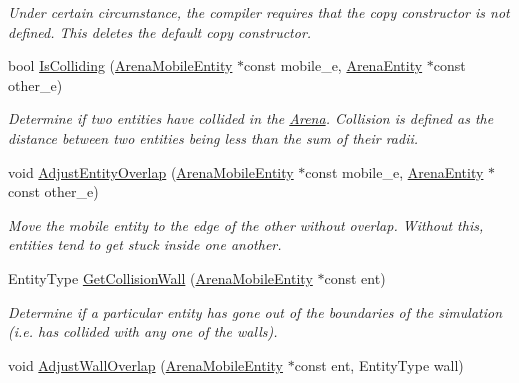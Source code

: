 \begin{DoxyCompactItemize}
\begin{DoxyCompactList}\small\item\em Under certain circumstance, the compiler requires that the copy constructor is not defined. This {\ttfamily deletes} the default copy constructor. \end{DoxyCompactList}\item 
bool \hyperlink{classArena_ab4479b0268867602d0c4b510d5f99aff}{Is\+Colliding} (\hyperlink{classArenaMobileEntity}{Arena\+Mobile\+Entity} $\ast$const mobile\+\_\+e, \hyperlink{classArenaEntity}{Arena\+Entity} $\ast$const other\+\_\+e)
\begin{DoxyCompactList}\small\item\em Determine if two entities have collided in the \hyperlink{classArena}{Arena}. Collision is defined as the distance between two entities being less than the sum of their radii. \end{DoxyCompactList}\item 
void \hyperlink{classArena_a2506fab770b6070d8f061bcab4c65138}{Adjust\+Entity\+Overlap} (\hyperlink{classArenaMobileEntity}{Arena\+Mobile\+Entity} $\ast$const mobile\+\_\+e, \hyperlink{classArenaEntity}{Arena\+Entity} $\ast$const other\+\_\+e)\hypertarget{classArena_a2506fab770b6070d8f061bcab4c65138}{}\label{classArena_a2506fab770b6070d8f061bcab4c65138}

\begin{DoxyCompactList}\small\item\em Move the mobile entity to the edge of the other without overlap. Without this, entities tend to get stuck inside one another. \end{DoxyCompactList}\item 
Entity\+Type \hyperlink{classArena_a7b72cf7688ee6ab1395bf438663bc1da}{Get\+Collision\+Wall} (\hyperlink{classArenaMobileEntity}{Arena\+Mobile\+Entity} $\ast$const ent)
\begin{DoxyCompactList}\small\item\em Determine if a particular entity has gone out of the boundaries of the simulation (i.\+e. has collided with any one of the walls). \end{DoxyCompactList}\item 
void \hyperlink{classArena_a51c1e99dfd9a618c6041fd22d0a11959}{Adjust\+Wall\+Overlap} (\hyperlink{classArenaMobileEntity}{Arena\+Mobile\+Entity} $\ast$const ent, Entity\+Type wall)\hypertarget{classArena_a51c1e99dfd9a618c6041fd22d0a11959}{}\label{classArena_a51c1e99dfd9a618c6041fd22d0a11959}


\end{DoxyCompactItemize}
